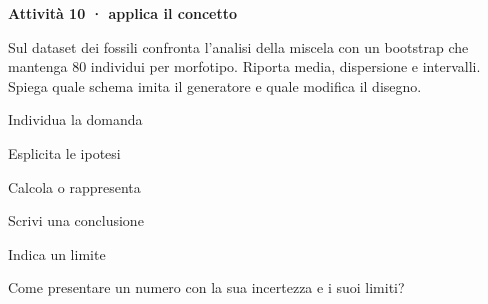 \documentclass[12pt,aspectratio=1610]{beamer}
\begin{document}
\begin{lrbox}{\TitleBox}\begin{minipage}[t]{18.2cm}\color{Ink}\raggedright\sloppy\fontsize{20.7}{24}\selectfont
\bfseries\color{Navy}Attività 10 · applica il concetto
\end{minipage}\end{lrbox}
\begin{lrbox}{\BodyBox}\begin{minipage}[t]{10.25cm}\color{Ink}\raggedright\sloppy\fontsize{12.4}{16.4}\selectfont
Sul dataset dei fossili confronta l'analisi della miscela con un bootstrap che mantenga 80 individui per morfotipo. Riporta media, dispersione e intervalli. Spiega quale schema imita il generatore e quale modifica il disegno.
\end{minipage}\end{lrbox}
\begin{lrbox}{\SideBox}\begin{minipage}[t]{7.45cm}\color{Ink}\raggedright\sloppy\fontsize{12.2}{16.1}\selectfont
{}\hspace{.35cm}Individua la domanda\par\vspace{.22cm}\hspace{.35cm}Esplicita le ipotesi\par\vspace{.22cm}\hspace{.35cm}Calcola o rappresenta\par\vspace{.22cm}\hspace{.35cm}Scrivi una conclusione\par\vspace{.22cm}\hspace{.35cm}Indica un limite\par\vspace{.22cm}
\end{minipage}\end{lrbox}
\begin{lrbox}{\RecallBox}\begin{minipage}[t]{16.45cm}\color{Ink}\raggedright\sloppy\fontsize{10.1}{13.2}\selectfont
Come presentare un numero con la sua incertezza e i suoi limiti?
\end{minipage}\end{lrbox}
\end{document}
